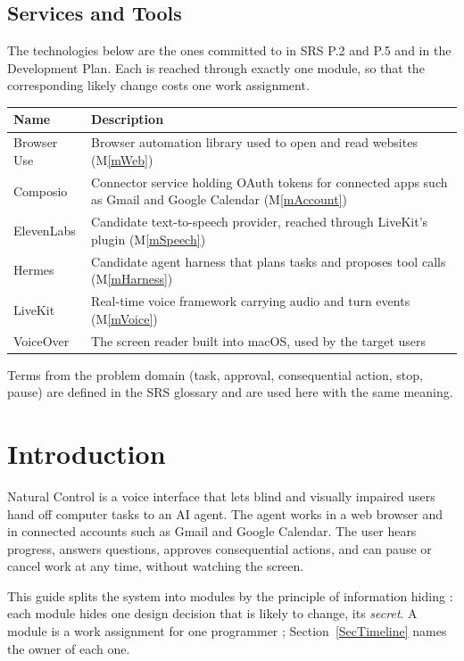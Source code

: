 \documentclass[12pt, titlepage]{article}
\newcommand{\mref}[1]{M\ref{#1}}
\begin{document}
\subsection{Services and Tools}

The technologies below are the ones committed to in SRS P.2 and P.5 and in the
Development Plan. Each is reached through exactly one module, so that the
corresponding likely change costs one work assignment.

\begin{tabular}{@{}p{2.4cm}p{13.2cm}@{}}
\toprule
\textbf{Name} & \textbf{Description}\\
\midrule
Browser Use & Browser automation library used to open and read websites (\mref{mWeb})\\
Composio & Connector service holding OAuth tokens for connected apps such as Gmail and Google Calendar (\mref{mAccount})\\
ElevenLabs & Candidate text-to-speech provider, reached through LiveKit's plugin (\mref{mSpeech})\\
Hermes & Candidate agent harness that plans tasks and proposes tool calls (\mref{mHarness})\\
LiveKit & Real-time voice framework carrying audio and turn events (\mref{mVoice})\\
VoiceOver & The screen reader built into macOS, used by the target users\\
\bottomrule
\end{tabular}

Terms from the problem domain (task, approval, consequential action, stop, pause)
are defined in the SRS glossary and are used here with the same meaning.

\newpage
\tableofcontents
\newpage
{}

\section{Introduction}

Natural Control is a voice interface that lets blind
and visually impaired users hand off computer tasks to an AI agent. The agent works 
in a web browser and in connected accounts such as Gmail and Google Calendar. 
The user hears progress, answers questions, approves consequential actions, and can 
pause or cancel work at any time, without watching the screen.

This guide splits the system into modules by the principle of information hiding
\citep{Parnas1972a}: each module hides one design decision that is likely to
change, its \emph{secret}. A module is a work assignment for one programmer
\citep{ParnasEtAl1984}; Section~\ref{SecTimeline} names the owner of each one.
\end{document}
